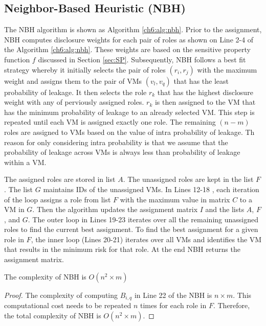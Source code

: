 \subsection{Neighbor-Based Heuristic (NBH)}
The NBH algorithm is shown as Algorithm \ref{ch6:alg:nbh}. Prior to the assignment, NBH computes disclosure weights for each pair of roles as shown on Line  2-4 of the Algorithm \ref{ch6:alg:nbh}. These weights are based on the sensitive property function $f$ discussed in Section \ref{sec:SP}.  Subsequently, NBH follows a best fit strategy  whereby it initially selects the pair of roles  $(r_i,r_j)$ with the maximum weight and assigns them to the pair of VMs $(v_l,v_q)$  that has the least probability of leakage. It then selects the role $r_k$ that has the highest disclosure weight with any of perviously assigned roles.  $r_k$ is then assigned to  the VM that has the minimum probability of leakage to an already selected VM.  This step is repeated  until each VM is assigned exactly one role. The remaining $(n-m)$  roles are assigned to VMs based on the value of intra probability of leakage. Th reason for only considering intra probability is that we assume  that the probability of leakage  across VMs is always less than probability of leakage within a VM. 

The assigned roles are stored in list $A$. The unassigned  roles are kept in the list $F$. The list $G$ maintains IDs of the unassigned VMs. In Lines 12-18 , each iteration of  the loop assigns a role from list $F$ with the maximum value in matrix $C$ to a VM in $G$. Then the algorithm updates the assignment matrix $I$ and the lists $A$, $F$, and $G$. The outer loop in Lines 19-23 iterates over all the remaining unassigned roles to find the current best assignment. To find the best assignment for a given role in $F$, the inner loop (Lines 20-21) iterates over all VMs  and identifies the  VM that results in the minimum risk for that role. At the end NBH returns the assignment matrix.

\begin{lemma}
The  complexity of NBH is $O(n^2 \times m)$
\end{lemma}
\begin{proof}
The complexity of computing  $B_{i,q} $ in Line 22 of the NBH is $n \times m$. This  computational cost needs to be repeated $n$ times for each role in $F$. Therefore, the total complexity of NBH is  $O(n^2 \times m)$.

\end{proof}

